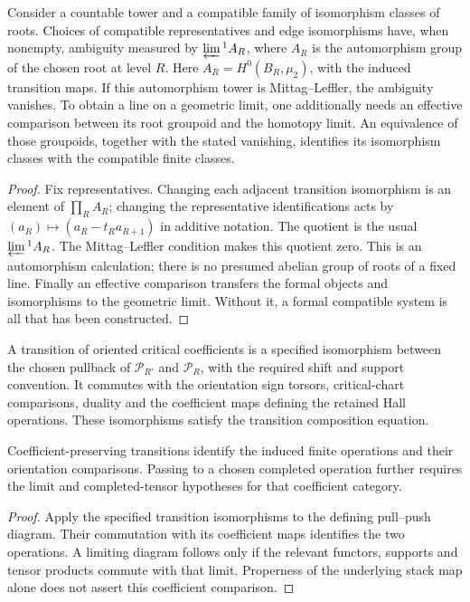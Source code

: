 \begin{proposition}
\label{prop:orientation-no-new-limit-class}
Consider a countable tower and a compatible family of isomorphism
classes of roots.  Choices of compatible representatives and edge
isomorphisms have, when nonempty, ambiguity measured by
\(\varprojlim{}^1 A_R\), where \(A_R\) is the automorphism group
of the chosen root at level \(R\).  Here
\(A_R=H^0(B_R,\mu_2)\), with the induced transition maps.
If this automorphism tower is Mittag--Leffler, the ambiguity vanishes.
To obtain a line on a geometric limit, one additionally needs an
effective comparison between its root groupoid and the homotopy
limit.  An equivalence of those groupoids, together with the stated
vanishing, identifies its isomorphism classes with the compatible
finite classes.
\end{proposition}
\begin{proof}
Fix representatives.  Changing each adjacent transition isomorphism
is an element of \(\prod_R A_R\); changing the representative
identifications acts by
\((a_R)\mapsto(a_R-t_Ra_{R+1})\) in additive notation.  The quotient
is the usual \(\varprojlim{}^1 A_R\).  The Mittag--Leffler condition
makes this quotient zero.  This is an automorphism calculation;
there is no presumed abelian group of roots of a fixed line.
Finally an effective comparison transfers the formal objects and
isomorphisms to the geometric limit.  Without it, a formal compatible
system is all that has been constructed.
\end{proof}

\begin{definition}
\label{def:transition-vanishing-cycle-preservation}
A transition of oriented critical coefficients is a specified
isomorphism between the chosen pullback of \(\mathcal P_{R'}\)
and \(\mathcal P_R\), with the required shift and support convention.
It commutes with the orientation sign torsors, critical-chart
comparisons, duality and the coefficient maps defining the retained
Hall operations.  These isomorphisms satisfy the transition
composition equation.
\end{definition}

\begin{proposition}
\label{prop:transition-vanishing-cycle-preservation-criterion}
Coefficient-preserving transitions identify the induced finite
operations and their orientation comparisons.  Passing to a chosen
completed operation further requires the limit and completed-tensor
hypotheses for that coefficient category.
\end{proposition}
\begin{proof}
Apply the specified transition isomorphisms to the defining
pull--push diagram.  Their commutation with its coefficient maps
identifies the two operations.  A limiting diagram follows only if
the relevant functors, supports and tensor products commute with
that limit.  Properness of the underlying stack map alone does not
assert this coefficient comparison.
\end{proof}

